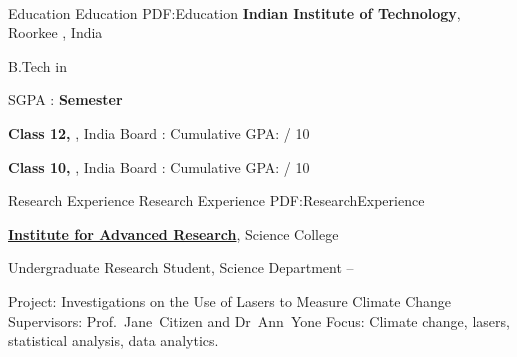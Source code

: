 \documentclass[letterpaper,MMMyyyy,nonstopmode]{simpleresumecv}
\begin{document}


\begin{SubTitle}
\par
{}
\,\SubBulletSymbol\,
\,\SubBulletSymbol\,
\href{mailto:\VAR{student.email}}
{}
\,\SubBulletSymbol\,
\,\SubBulletSymbol\,
\end{SubTitle}

\begin{Body}




\Section
{Education}
{Education}
{PDF:Education}
\Entry
\textbf{Indian Institute of Technology},
Roorkee , India

\Gap
\BulletItem
{B.Tech in }

\begin{Detail}
\SubBulletItem
SGPA : {}
\hfill
\textbf{ Semester}
\end{Detail}

\BigGap
\Entry
\textbf{Class 12, },
India
\Gap
\BulletItem
Board : 
\hfill
{}
\BulletItem
Cumulative GPA:  / 10

\BigGap
\Entry
\textbf{Class 10, },
India
\Gap
\BulletItem
Board : 
\hfill
{}
\BulletItem
Cumulative GPA:  / 10




\Section
{Research Experience}
{Research Experience}
{PDF:ResearchExperience}

\Entry
\href{http://www.example.com/my-institute}
{\textbf{Institute for Advanced Research}},
Science College

\Gap
\BulletItem
Undergraduate Research Student, Science Department
\hfill
{} --
\begin{Detail}
\SubBulletItem
Project:
Investigations on the Use of Lasers to Measure Climate Change
\SubBulletItem
Supervisors:
Prof.~Jane~Citizen and
Dr~Ann~Yone
\SubBulletItem
Focus:
Climate change, lasers, statistical analysis, data analytics.
\end{Detail}



\end{Body}
\end{document}
